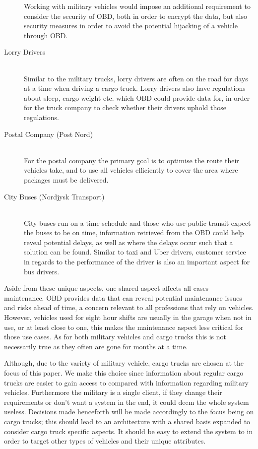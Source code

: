 \begin{description}
    Working with military vehicles would impose an additional requirement to consider the security of \ac{OBD}, both in order to encrypt the data, but also security measures in order to avoid the potential hijacking of a vehicle through \ac{OBD}.
    \item [Lorry Drivers] \hfill \\
    Similar to the military trucks, lorry drivers are often on the road for days at a time when driving a cargo truck.
    Lorry drivers also have regulations about sleep, cargo weight etc. which \ac{OBD} could provide data for, in order for the truck company to check whether their drivers uphold those regulations.
    \item [Postal Company (Post Nord)] \hfill \\
    For the postal company the primary goal is to optimise the route their vehicles take, and to use all vehicles efficiently to cover the area where packages must be delivered.
    \item [City Buses (Nordjysk Transport)] \hfill \\
    City buses run on a time schedule and those who use public transit expect the buses to be on time, information retrieved from the \ac{OBD} could help reveal potential delays, as well as where the delays occur such that a solution can be found.
    Similar to taxi and Uber drivers, customer service in regards to the performance of the driver is also an important aspect for bus drivers.
\end{description}

\bigskip
Aside from these unique aspects, one shared aspect affects all cases --- maintenance.
\ac{OBD} provides data that can reveal potential maintenance issues and risks ahead of time, a concern relevant to all professions that rely on vehicles.
However, vehicles used for eight hour shifts are usually in the garage when not in use, or at least close to one, this makes the maintenance aspect less critical for those use cases.
As for both military vehicles and cargo trucks this is not necessarily true as they often are gone for months at a time.

Although, due to the variety of military vehicle, cargo trucks are chosen at the focus of this paper.
We make this choice since information about regular cargo trucks are easier to gain access to compared with information regarding military vehicles.
Furthermore the military is a single client, if they change their requirements or don't want a system in the end, it could deem the whole system useless.
Decisions made henceforth will be made accordingly to the focus being on cargo trucks; this should lead to an architecture with a shared basis expanded to consider cargo truck specific aspects.
It should be easy to extend the system to in order to target other types of vehicles and their unique attributes.

